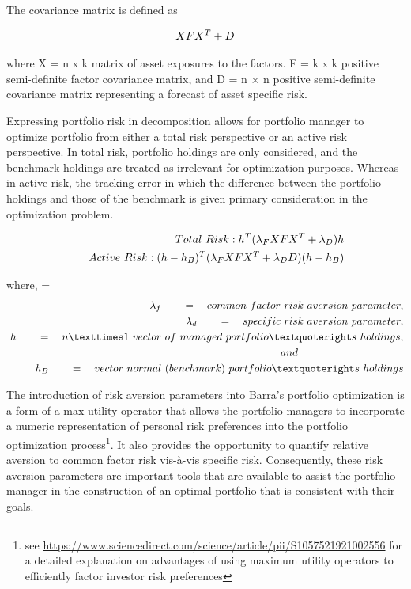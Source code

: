 \documentclass[12pt,preprint, authoryear]{elsarticle}
\numberwithin{equation}{section}
\numberwithin{figure}{section}
\numberwithin{table}{section}
\let\rmarkdownfootnote\footnote%
\def\footnote{\protect\rmarkdownfootnote}
\begin{document}
The covariance matrix is defined as

\begin{align}
 XFX^T + D \label{eq1} \notag
\end{align}

where X = n x k matrix of asset exposures to the factors. F = k x k
positive semi-definite factor covariance matrix, and D = n × n positive
semi-definite covariance matrix representing a forecast of asset
specific risk.

Expressing portfolio risk in decomposition allows for portfolio manager
to optimize portfolio from either a total risk perspective or an active
risk perspective. In total risk, portfolio holdings are only considered,
and the benchmark holdings are treated as irrelevant for optimization
purposes. Whereas in active risk, the tracking error in which the
difference between the portfolio holdings and those of the benchmark is
given primary consideration in the optimization problem.

\begin{align}
 Total\ Risk : h^T(\lambda_FXFX^T + \lambda_D)h\\ \quad \quad  \notag 
 Active \ Risk : (h-h_B)^T(\lambda_FXFX^T+\lambda_DD)(h-h_B) \notag
\end{align}

where, = \begin{align}
\lambda_f \quad \quad  = \quad common \ factor\ risk\ aversion\ parameter,\\ \lambda_d \quad \quad = \quad specific\ \notag risk\ aversion\ parameter,\\\ h \quad \quad = \quad n×1 \ vector\ of\ managed\ portfolio’s\ holdings,\\ and \quad \notag \quad \quad \quad \quad \quad \quad \quad \quad \quad\\h_B \quad \quad =\quad vector \ normal\ (benchmark)\ portfolio’s\ holdings \notag 
\end{align}

The introduction of risk aversion parameters into Barra's portfolio
optimization is a form of a max utility operator that allows the
portfolio managers to incorporate a numeric representation of personal
risk preferences into the portfolio optimization process\footnote{see
  \url{https://www.sciencedirect.com/science/article/pii/S1057521921002556}
  for a detailed explanation on advantages of using maximum utility
  operators to efficiently factor investor risk preferences}. It also
provides the opportunity to quantify relative aversion to common factor
risk vis-à-vis specific risk. Consequently, these risk aversion
parameters are important tools that are available to assist the
portfolio manager in the construction of an optimal portfolio that is
consistent with their goals.
\end{document}
